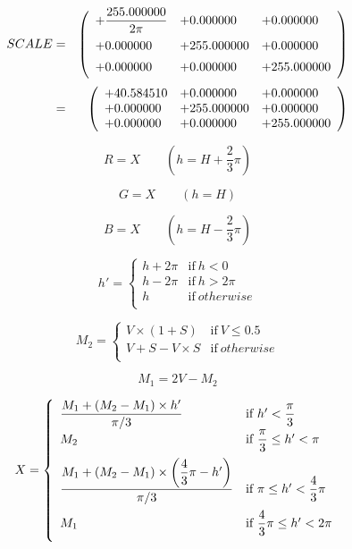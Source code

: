 \documentclass{article}
\begin{document}
\begin{eqnarray*} SCALE &=& \left( \begin{array}{lll} +\dfrac{255.000000}{2\pi} & +0.000000 & +0.000000 \vspace{.5em} \\ +0.000000 & +255.000000 & +0.000000 \vspace{.5em} \\ +0.000000 & +0.000000 & +255.000000 \vspace{.5em} \\ \end{array} \right) \\ &=& \left( \begin{array}{lll} +40.584510 & +0.000000 & +0.000000 \\ +0.000000 & +255.000000 & +0.000000 \\ +0.000000 & +0.000000 & +255.000000 \\ \end{array} \right) \end{eqnarray*}
\pagebreak

\[ R = X\qquad \left(h = H + \frac{2}{3} \pi\right) \]
\pagebreak

\[ G = X\qquad \left(h = H\right) \]
\pagebreak

\[ B = X\qquad \left(h = H - \frac{2}{3} \pi\right) \]
\pagebreak

\[ h'=\left \{ \begin{array}{ll} h + 2\pi & \mbox{if}\ h<0 \\ h - 2\pi & \mbox{if}\ h>2\pi \\ h & \mbox{if}\ otherwise \\ \end{array} \right. \]
\pagebreak

\[ M_{2}=\left \{ \begin{array}{ll} V\times \left(1 + S\right) & \mbox{if}\ V\le 0.5 \\ V + S - V\times S & \mbox{if}\ otherwise \\ \end{array} \right. \]
\pagebreak

\[ M_{1}=2V - M_{2} \]
\pagebreak

\[ X=\left \{ \begin{array}{ll} \dfrac{M_{1} + \left(M_{2} - M_{1}\right)\times h'}{\pi/3} & \mbox{if}\ h'<\dfrac{\pi}{3} \\ M_{2} & \mbox{if}\ \dfrac{\pi}{3} \le h' < \pi \vspace{.5em} \\ \dfrac{M_{1} + \left(M_{2} - M_{1}\right)\times \left(\dfrac{4}{3} \pi - h'\right)}{\pi/3} & \mbox{if}\ \pi \le h' < \dfrac{4}{3}\pi \vspace{.5em} \\ M_{1} & \mbox{if}\ \dfrac{4}{3}\pi \le h' < 2\pi \vspace{.5em} \\ \end{array} \right. \]
\pagebreak
\end{document}
